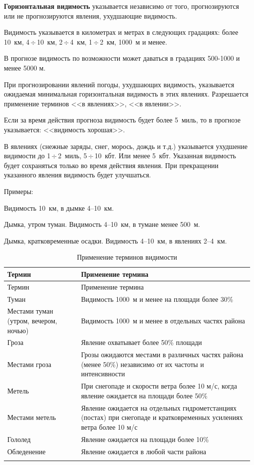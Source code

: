 \documentclass[a4paper, 12pt, twoside, final, book, russian, fittopage, cyremdash, openright]{ncc}
\newcommand{\otdo}{\,\ensuremath{\div}\,}
\begin{document}
\textbf{Горизонтальная видимость} указывается независимо от того,
прогнозируются или не прогнозируются явления, ухудшающие видимость.

Видимость указывается в километрах и метрах в следующих градациях: более 10~км, 4\otdo10~км, 2\otdo4~км, 1\otdo2~км, 1000~м и менее.

В прогнозе видимость по возможности может даваться в градациях 500-1000 и менее 5000 м.

При прогнозировании явлений погоды, ухудшающих видимость, указывается
ожидаемая минимальная горизонтальная видимость в этих
явлениях. Разрешается применение терминов <<в явлениях>>,
<<в явлении>>.

Если за время действия прогноза видимость будет более 5~миль, то в
прогнозе указывается: <<видимость хорошая>>.

В явлениях (снежные заряды, снег, морось, дождь и т.д.) указывается
ухудшение видимости до 1\otdo2~миль, 5\otdo10~кбт. Или менее
5~кбт. Указанная видимость будет сохраняться только во время действия
явления. При прекращении указанного явления видимость будет
улучшаться.

Примеры:
\begin{list}{}{}
\item Видимость 10~км, в дымке 4--10~км.
\item Дымка, утром туман. Видимость 4--10~км, в тумане менее 500~м.
\item Дымка, кратковременные осадки. Видимость 4--10~км, в явлениях 2--4~км.
\end{list}

\small
\begin{longtable}{p{}|p{}}
  \toprule
  Термин & Применение термина \\
  \midrule
  \endfirsthead
  \toprule
  Термин & Применение термина \\
  \midrule
  \endhead
  Туман
         & Видимость 1000~м и менее на площади более 30\% \\
  \midrule
  Местами туман (утром, вечером, ночью)
         & Видимость 1000~м и менее в отдельных частях района \\
  \midrule
  Гроза
         & Явление охватывает более 50\% площади \\
  \midrule
  Местами гроза
         & Грозы ожидаются местами в различных частях района (менее 50\%) независимо от их частоты и интенсивности \\
  \midrule
  Метель
         & При снегопаде и скорости ветра более 10 м/с, когда явление ожидается на площади более 50\% \\
  \midrule
  Местами метель
         & Явление ожидается на отдельных гидрометстанциях (постах) при снегопаде и кратковременных усилениях ветра более 10 м/с \\
  \midrule
  Гололед
         & Явление ожидается на площади более 10\% \\
  \midrule
  Обледенение
         & Явление ожидается в любой части района \\
  \bottomrule
  \caption{Применение терминов видимости}
\end{longtable}
\end{document}
